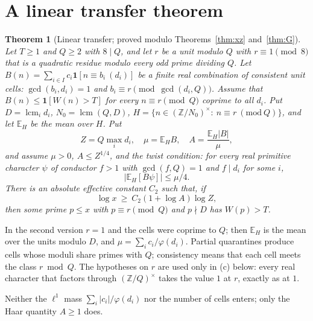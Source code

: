 \documentclass[11pt,reqno]{amsart}
\newtheorem{theorem}{Theorem}[section]
\theoremstyle{definition}
\newcommand{\lcm}{\operatorname{lcm}}
\newcommand{\E}{\mathbb E}
\begin{document}
\section{A linear transfer theorem}\label{sec:transfer}

\begin{theorem}[Linear transfer; proved modulo Theorems~\ref{thm:xz} and~\ref{thm:G}]\label{thm:transfer}
Let $T\ge1$ and $Q\ge2$ with $8\mid Q$, and let $r$ be a unit modulo $Q$ with
$r\equiv1\pmod8$ that is a quadratic residue modulo every odd prime dividing
$Q$.  Let $B(n)=\sum_{i\in I}c_i\mathbf 1[n\equiv b_i\ (d_i)]$ be a
finite real combination of \emph{consistent unit cells}: $\gcd(b_i,d_i)=1$ and
$b_i\equiv r\pmod{\gcd(d_i,Q)}$.  Assume that
$B(n)\le\mathbf 1[W(n)>T]$ for every $n\equiv r\pmod Q$ coprime to all $d_i$.  Put
$D=\lcm_id_i$, $N_0=\lcm(Q,D)$, $H=\{n\in(\mathbb Z/N_0)^\times:\ n\equiv r\ (\mathrm{mod}\ Q)\}$, and let $\E_H$
be the mean over $H$.  Put
\[
 Z=Q\max_id_i,\quad \mu=\E_H B,\quad
 A=\frac{\E_H|B|}{\mu},
\]
and assume $\mu>0$, $A\le Z^{1/4}$, and the \emph{twist condition}: for every
real primitive character $\psi$ of conductor $f>1$ with $\gcd(f,Q)=1$ and
$f\mid d_i$ for some $i$,
\[
 |\E_H[B\psi]|\le\mu/4.
\]
There is an absolute effective constant $C_2$ such that, if
\[
 \log x\ \ge\ C_2(1+\log A)\log Z,
\]
then some prime $p\le x$ with $p\equiv r\pmod Q$ and $p\nmid D$ has $W(p)>T$.
\end{theorem}

In the second version $r=1$ and the cells were coprime to $Q$; then $\E_H$ is the
mean over the units modulo $D$, and $\mu=\sum_ic_i/\varphi(d_i)$.  Partial
quarantines produce cells whose moduli share primes with $Q$; consistency
means that each cell meets the class $r\bmod Q$.  The hypotheses on $r$ are
used only in (c) below: every real character that factors through
$(\mathbb Z/Q)^\times$ takes the value $1$ at $r$, exactly as at $1$.

Neither the $\ell^1$ mass $\sum_i|c_i|/\varphi(d_i)$ nor the number of cells
enters; only the Haar quantity $A\ge1$ does.
\end{document}
